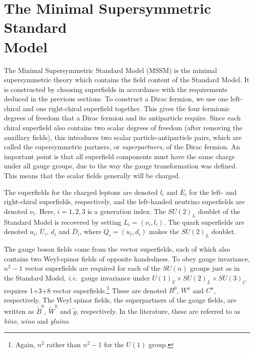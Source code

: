 \documentclass[twoside,english]{uiofysmaster}
\begin{document}
\section[The Minimal Supersymmetric Standard Model]{The Minimal Supersymmetric Standard\\ Model}
The Minimal Supersymmetric Standard Model (MSSM) is the minimal supersymmetric theory which contains the field content of the Standard Model. It is constructed by choosing superfields in accordance with the requirements deduced in the previous sections. To construct a Dirac fermion, we use one left-chiral and one right-chiral superfield together. This gives the four fermionic degrees of freedom that a Dirac fermion and its antiparticle require. Since each chiral superfield also contains two scalar degrees of freedom (after removing the auxillary fields), this introduces two scalar particle-antiparticle pairs, which are called the supersymmetric partners, or {\it superpartners}, of the Dirac fermion. An important point is that all superfield components must have the same charge under all gauge groups, due to the way the gauge transformation was defined. This means that the scalar fields generally will be charged. 

The superfields for the charged leptons are denoted $l_i$ and $\bar E_i$ for the left- and right-chiral superfields, respectively, and the left-handed neutrino superfields are denoted $\nu_i$. Here, $i=1,2,3$ is a generation index. The $SU(2)_L$ doublet of the Standard Model is recovered by setting $L_i = (\nu_i, l_i)$. The quark superfields are denoted $u_i$, $\bar U_i$, $d_i$ and $\bar D_i$, where $Q_i = (u_i, d_i)$ makes the $SU(2)_L$ doublet.

The gauge boson fields come from the vector superfields, each of which also contains two Weyl-spinor fields of opposite handedness. To obey gauge invariance, $n^2-1$ vector superfields are required for each of the $SU(n)$ groups just as in the Standard Model, {\it i.e.}\ gauge invariance under $U(1)_Y\times SU(2)_L \times SU(3)_C$ requires 1+3+8 vector superfields.\footnote{Again, $n^2$ rather than $n^2-1$ for the $U(1)$ group.} These are denoted $B^0$, $W^a$ and $C^a$, respectively. The Weyl spinor fields, the superpartners of the gauge fields, are written as $\tilde B^0$, $\tilde W^0$ and $\tilde g$, respectively. In the literature, these are referred to as {\it bino}, {\it wino} and {\it gluino}. 
\end{document}
